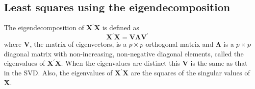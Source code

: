 \documentclass[shortnames,article]{jss}
\begin{document}
\subsection{Least squares using the eigendecomposition}
\label{sec:eigendecomp}

The eigendecomposition of $\bm X^\prime\bm X$ is defined as
\begin{displaymath}
  \bm X^\prime\bm X=\bm V\bm\Lambda\bm V^\prime
\end{displaymath}
where $\bm V$, the matrix of eigenvectors, is a $p\times p$ orthogonal
matrix and $\bm\Lambda$ is a $p\times p$ diagonal matrix with
non-increasing, non-negative diagonal elements, called the eigenvalues
of $\bm X^\prime\bm X$.  When the eigenvalues are distinct this $\bm
V$ is the same as that in the SVD.  Also, the eigenvalues of $\bm
X^\prime\bm X$ are the squares of the singular values of $\bm X$.
\end{document}
